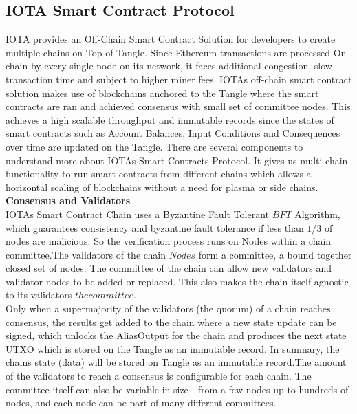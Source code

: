 \documentclass[10pt]{article}
\begin{document}
\subsection{IOTA Smart Contract Protocol}

IOTA provides an Off-Chain Smart Contract Solution for developers to create multiple-chains on Top of Tangle. Since Ethereum transactions are processed On-chain by every single node on its network, it faces additional congestion, slow transaction time and subject to higher miner fees. IOTA\textsc{}s off-chain smart contract solution makes use of blockchains anchored to the Tangle where the smart contracts are ran and achieved consensus with small set of committee nodes. This achieves a high scalable throughput and immutable records since the states of smart contracts such as Account Balances, Input Conditions and Consequences over time are updated on the Tangle. There are several components to understand more about IOTA\textsc{}s Smart Contracts Protocol. It gives us multi-chain functionality to run smart contracts from different chains which allows a horizontal scaling of blockchains without a need for plasma or side chains.\\

\textbf{Consensus and Validators}\\

IOTA\textsc{}s Smart Contract Chain uses a Byzantine Fault Tolerant \(BFT\) Algorithm, which guarantees consistency and byzantine fault tolerance if less than $1/3$ of nodes are malicious. So the verification process runs on Nodes within a chain committee.The validators of the chain \(Nodes\) form a committee, a bound together closed set of nodes. The committee of the chain can allow new validators and validator nodes to be added or replaced. This also makes the chain itself agnostic to its validators \(the committee\).\\

Only when a supermajority of the validators (the quorum) of a chain reaches consensus, the results get added to the chain where a new state update can be signed, which unlocks the AliasOutput for the chain and produces the next state UTXO which is stored on the Tangle as an immutable record. In summary, the chain\textsc{}s state (data) will be stored on Tangle as an immutable record.The amount of the validators to reach a consensus is configurable for each chain. The committee itself can also be variable in size - from a few nodes up to hundreds of nodes, and each node can be part of many different committees.
\end{document}
